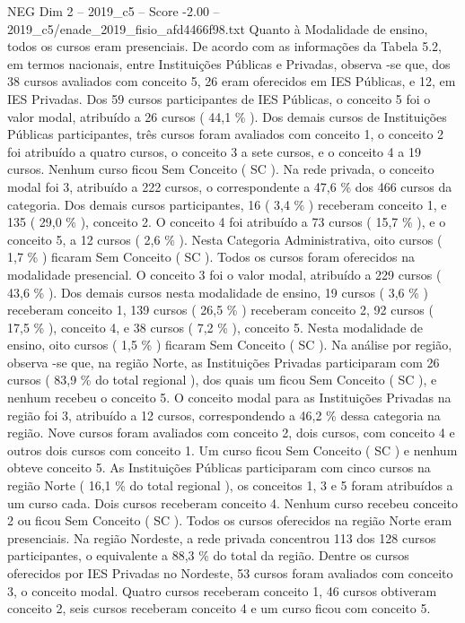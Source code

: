 \begin{textsample}{NEG Dim 2 – 2019\_c5 – Score -2.00 – 2019\_c5/enade\_2019\_fisio\_afd4466f98.txt}
Quanto à Modalidade de ensino, todos os cursos eram presenciais.
De acordo com as informações da Tabela 5.2, em termos nacionais, entre Instituições Públicas e Privadas, observa -se que, dos 38 cursos avaliados com conceito 5, 26 eram oferecidos em IES Públicas, e 12, em IES Privadas.
Dos 59 cursos participantes de IES Públicas, o conceito 5 foi o valor modal, atribuído a 26 cursos ( 44,1 \% ).
Dos demais cursos de Instituições Públicas participantes, três cursos foram avaliados com conceito 1, o conceito 2 foi atribuído a quatro cursos, o conceito 3 a sete cursos, e o conceito 4 a 19 cursos.
Nenhum curso ficou Sem Conceito ( SC ).
Na rede privada, o conceito modal foi 3, atribuído a 222 cursos, o correspondente a 47,6 \% dos 466 cursos da categoria.
Dos demais cursos participantes, 16 ( 3,4 \% ) receberam conceito 1, e 135 ( 29,0 \% ), conceito 2.
O conceito 4 foi atribuído a 73 cursos ( 15,7 \% ), e o conceito 5, a 12 cursos ( 2,6 \% ).
Nesta Categoria Administrativa, oito cursos ( 1,7 \% ) ficaram Sem Conceito ( SC ).
Todos os cursos foram oferecidos na modalidade presencial.
O conceito 3 foi o valor modal, atribuído a 229 cursos ( 43,6 \% ).
Dos demais cursos nesta modalidade de ensino, 19 cursos ( 3,6 \% ) receberam conceito 1, 139 cursos ( 26,5 \% ) receberam conceito 2, 92 cursos ( 17,5 \% ), conceito 4, e 38 cursos ( 7,2 \% ), conceito 5.
Nesta modalidade de ensino, oito cursos ( 1,5 \% ) ficaram Sem Conceito ( SC ).
Na análise por região, observa -se que, na região Norte, as Instituições Privadas participaram com 26 cursos ( 83,9 \% do total regional ), dos quais um ficou Sem Conceito ( SC ), e nenhum recebeu o conceito 5.
O conceito modal para as Instituições Privadas na região foi 3, atribuído a 12 cursos, correspondendo a 46,2 \% dessa categoria na região.
Nove cursos foram avaliados com conceito 2, dois cursos, com conceito 4 e outros dois cursos com conceito 1.
Um curso ficou Sem Conceito ( SC ) e nenhum obteve conceito 5.
As Instituições Públicas participaram com cinco cursos na região Norte ( 16,1 \% do total regional ), os conceitos 1, 3 e 5 foram atribuídos a um curso cada.
Dois cursos receberam conceito 4.
Nenhum curso recebeu conceito 2 ou ficou Sem Conceito ( SC ).
Todos os cursos oferecidos na região Norte eram presenciais.
Na região Nordeste, a rede privada concentrou 113 dos 128 cursos participantes, o equivalente a 88,3 \% do total da região.
Dentre os cursos oferecidos por IES Privadas no Nordeste, 53 cursos foram avaliados com conceito 3, o conceito modal.
Quatro cursos receberam conceito 1, 46 cursos obtiveram conceito 2, seis cursos receberam conceito 4 e um curso ficou com conceito 5.

\end{textsample}
